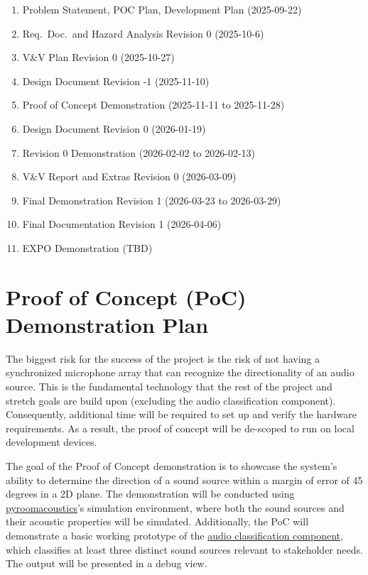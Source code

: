 \documentclass{article}
\begin{document}
\begin{enumerate}
  \item Problem Statement, POC Plan, Development Plan (2025-09-22)
  \item Req.\ Doc.\ and Hazard Analysis Revision 0 (2025-10-6)
  \item V\&V Plan Revision 0 (2025-10-27)
  \item Design Document Revision -1 (2025-11-10)
  \item Proof of Concept Demonstration (2025-11-11 to 2025-11-28)
  \item Design Document Revision 0 (2026-01-19)
  \item Revision 0 Demonstration (2026-02-02 to 2026-02-13)
  \item V\&V Report and Extras Revision 0 (2026-03-09)
  \item Final Demonstration Revision 1 (2026-03-23 to 2026-03-29)
  \item Final Documentation Revision 1 (2026-04-06)
  \item EXPO Demonstration (TBD)
\end{enumerate}

\section{Proof of Concept (PoC) Demonstration Plan}

The biggest risk \label{risk} for the success of the project is the risk of not
having a
synchronized microphone array that can recognize the directionality of an audio
source. This is the fundamental technology that the rest of the project and
stretch goals are build upon (excluding the audio classification component).
Consequently, additional time will be required to set up and verify the hardware
requirements. As a result, the proof of concept will be de-scoped to run
on local development devices.
\newline

The goal of the Proof of Concept demonstration is to showcase the system's
ability to determine the direction of a sound source within a margin of error of
45 degrees in a 2D plane. The demonstration will be conducted using 
\href{https://pypi.org/project/pyroomacoustics/}{pyroomacoustics}'s
simulation environment, where both the sound sources and their acoustic
properties will be simulated. Additionally, the PoC will demonstrate a basic
working prototype of the
\hyperlink{audio_classification_component}{audio classification component},
which classifies at least three distinct sound sources relevant to stakeholder
needs. The output will be presented in a debug view.
\newline
\end{document}
